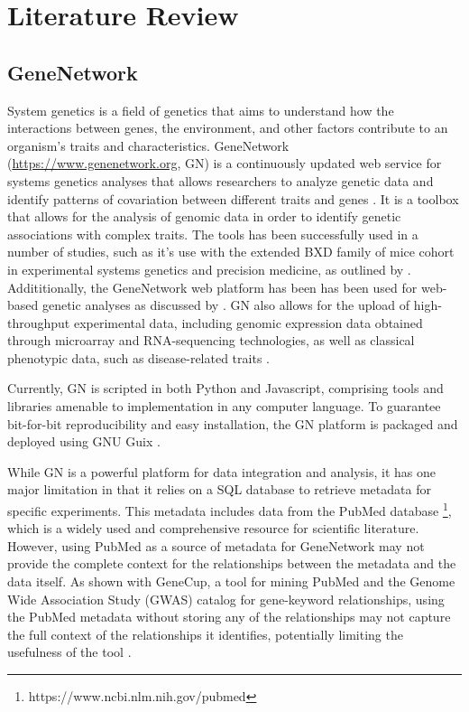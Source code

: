 \chapter{Literature Review}

\section{GeneNetwork}
System genetics is a field of genetics that aims to understand how the interactions between genes, the environment, and other factors contribute to an organism's traits and characteristics.  GeneNetwork (\url{https://www.genenetwork.org}, GN) is a continuously updated web service for systems genetics analyses that allows researchers to analyze genetic data and identify patterns of covariation between different traits and genes \citep{mulligan2017genenetwork}.  It is a toolbox that allows for the analysis of genomic data in order to identify genetic associations with complex traits.  The tools has been successfully used in a number of studies, such as it's use with the extended BXD family of mice cohort in experimental systems genetics and precision medicine, as outlined by \citep{Ashbrook:2019}.  Addititionally, the GeneNetwork web platform has been has been used for web-based genetic analyses as discussed by \citep{sloan2016genenetwork}.  GN also allows for the upload of high-throughput experimental data, including genomic expression data obtained through microarray and RNA-sequencing technologies, as well as classical phenotypic data, such as disease-related traits \citep{Anderson:2021}.

Currently, GN is scripted in both Python and Javascript, comprising tools and libraries amenable to implementation in any computer language.  To guarantee bit-for-bit reproducibility and easy installation, the GN platform is packaged and deployed using GNU Guix \citep{sloan2016genenetwork}.

While GN is a powerful platform for data integration and analysis, it has one major limitation in that it relies on a SQL database to retrieve metadata for specific experiments.  This metadata includes data from the PubMed database \footnote{https://www.ncbi.nlm.nih.gov/pubmed}, which is a widely used and comprehensive resource for scientific literature.  However, using PubMed  as a source of metadata for GeneNetwork may not provide the complete context for the relationships between the metadata and the data itself.  As shown with GeneCup, a tool for mining PubMed and the Genome Wide Association Study (GWAS) catalog for gene-keyword relationships, using the PubMed metadata without storing any of the relationships may not capture the full context of the relationships it identifies, potentially limiting the usefulness of the tool \citep{gunturkun2022genecup}.


